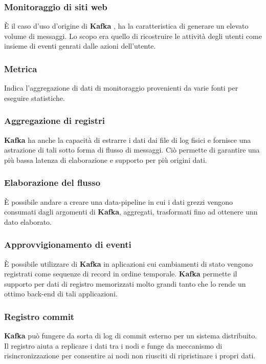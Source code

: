 \documentclass{article}
\begin{document}
\subsubsection{Monitoraggio di siti web}
È il caso d'uso d'origine di \textbf{Kafka} , ha la caratteristica di generare un elevato volume di messaggi. Lo scopo era quello di ricostruire le attività degli utenti come insieme di eventi genrati dalle azioni dell'utente.
\subsubsection{Metrica}
Indica l'aggregazione di dati di monitoraggio provenienti da varie fonti per eseguire statistiche.
\subsubsection{Aggregazione di registri}
\textbf{Kafka} ha anche la capacità di estrarre i dati dai file di log fisici e fornisce una astrazione di tali sotto forma di flusso di messaggi. Ciò permette di garantire una più bassa latenza di elaborazione e supporto per più origini dati.
\subsubsection{Elaborazione del flusso}
È possibile andare a creare una  data-pipeline in cui i dati grezzi vengono consumati dagli argomenti di \textbf{Kafka}, aggregati, trasformati fino ad ottenere unn dato elaborato.
\subsubsection{Approvvigionamento di eventi}
È possibile utilizzare  di \textbf{Kafka} in aplicazioni cui cambiamenti di stato vengono registrati come sequenze di record in ordine temporale. \textbf{Kafka} permette il supporto per dati di registro memorizzati molto grandi tanto che lo rende un ottimo back-end di tali applicazioni. 
\subsubsection{Registro commit}
\textbf{Kafka} può fungere da sorta di log di commit esterno per un sistema distribuito. Il registro aiuta a replicare i dati tra i nodi e funge da meccanismo di risincronizzazione per consentire ai nodi non riusciti di ripristinare i propri dati.
\newpage





\end{document}
